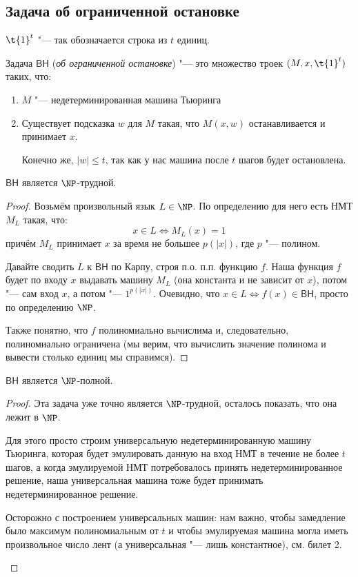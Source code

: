 \subsection{Задача об ограниченной остановке}
	\begin{Def}
		$\t{1}^t$ "--- так обозначается строка из $t$ единиц.
	\end{Def}
	\begin{Def}
		Задача $\mathsf{BH}$ (\textit{об ограниченной остановке}) "--- это множество троек $(M, x, \t{1}^t)$ таких, что:
		\begin{enumerate}
			\item
				$M$ "--- недетерминированная машина Тьюринга
			\item
				Существует подсказка $w$ для $M$ такая, что $M(x, w)$ останавливается и принимает $x$.
				\begin{Rem}
					Конечно же, $|w| \le t$, так как у нас машина после $t$ шагов будет остановлена.
				\end{Rem}
		\end{enumerate}
	\end{Def}

	\begin{theorem}
		$\mathsf{BH}$ является $\NP$-трудной.
	\end{theorem}
	\begin{proof}
		Возьмём произвольный язык $L \in \NP$.
		По определению для него есть НМТ $M_L$ такая, что:
		\[ x \in L \iff M_L(x) = 1 \]
		причём $M_L$ принимает $x$ за время не большее $p(|x|)$, где $p$ "--- полином.

		Давайте сводить $L$ к $\mathsf{BH}$ по Карпу, строя п.о. п.п. функцию $f$.
		Наша функция $f$ будет по входу $x$ выдавать машину $M_L$ (она константа и не зависит от $x$),
		потом "--- сам вход $x$, а потом "--- $1^{p(|x|)}$.
		Очевидно, что $x \in L \iff f(x) \in \mathsf{BH}$, просто по определению $\NP$.

		Также понятно, что $f$ полиномиально вычислима и, следовательно, полиномиально ограничена
		(мы верим, что вычислить значение полинома и вывести столько единиц мы справимся).
	\end{proof}

	\begin{theorem}
		$\mathsf{BH}$ является $\NP$-полной.
	\end{theorem}
	\begin{proof}
		Эта задача уже точно является $\NP$-трудной, осталось показать, что она лежит в $\NP$.

		Для этого просто строим универсальную недетерминированную машину Тьюринга, которая будет эмулировать данную на вход НМТ
		в течение не более $t$ шагов, а когда эмулируемой НМТ потребовалось принять недетерминированное решение, наша универсальная машина тоже
		будет принимать недетерминированное решение.
		\begin{Rem}
			Осторожно с построением универсальных машин: нам важно, чтобы замедление было максимум полиномиальным от $t$ и чтобы эмулируемая машина
			могла иметь произвольное число лент (а универсальная "--- лишь константное), см. билет 2.
		\end{Rem}
	\end{proof}
